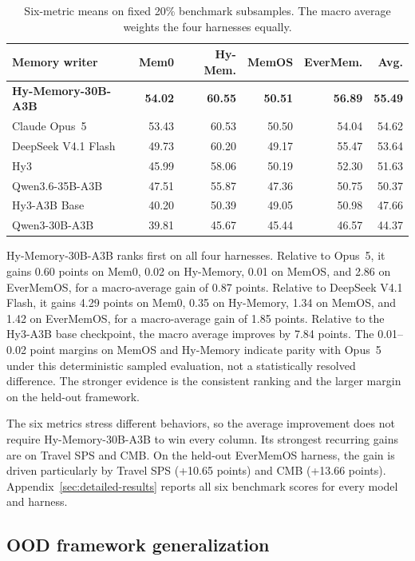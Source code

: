\documentclass{article}
\begin{document}
\begin{table}[t]
\centering
\small
\setlength{\tabcolsep}{3.5pt}
\begin{tabular}{@{}lrrrrr@{}}
\toprule
Memory writer & Mem0 & Hy-Mem. & MemOS & EverMem. & Avg. \\
\midrule
\textbf{Hy-Memory-30B-A3B} & \textbf{54.02} & \textbf{60.55} & \textbf{50.51} & \textbf{56.89} & \textbf{55.49} \\
Claude Opus~5 & 53.43 & 60.53 & 50.50 & 54.04 & 54.62 \\
DeepSeek V4.1 Flash & 49.73 & 60.20 & 49.17 & 55.47 & 53.64 \\
Hy3 & 45.99 & 58.06 & 50.19 & 52.30 & 51.63 \\
Qwen3.6-35B-A3B & 47.51 & 55.87 & 47.36 & 50.75 & 50.37 \\
Hy3-A3B Base & 40.20 & 50.39 & 49.05 & 50.98 & 47.66 \\
Qwen3-30B-A3B & 39.81 & 45.67 & 45.44 & 46.57 & 44.37 \\
\bottomrule
\end{tabular}
\caption{Six-metric means on fixed 20\% benchmark subsamples. The macro average weights the four harnesses equally.}
\label{tab:main-results}
\end{table}

Hy-Memory-30B-A3B ranks first on all four harnesses. Relative to Opus~5, it gains 0.60 points on Mem0, 0.02 on Hy-Memory, 0.01 on MemOS, and 2.86 on EverMemOS, for a macro-average gain of 0.87 points. Relative to DeepSeek V4.1 Flash, it gains 4.29 points on Mem0, 0.35 on Hy-Memory, 1.34 on MemOS, and 1.42 on EverMemOS, for a macro-average gain of 1.85 points. Relative to the Hy3-A3B base checkpoint, the macro average improves by 7.84 points. The 0.01--0.02 point margins on MemOS and Hy-Memory indicate parity with Opus~5 under this deterministic sampled evaluation, not a statistically resolved difference. The stronger evidence is the consistent ranking and the larger margin on the held-out framework.

The six metrics stress different behaviors, so the average improvement does not require Hy-Memory-30B-A3B to win every column. Its strongest recurring gains are on Travel SPS and CMB. On the held-out EverMemOS harness, the gain is driven particularly by Travel SPS (+10.65 points) and CMB (+13.66 points). Appendix~\ref{sec:detailed-results} reports all six benchmark scores for every model and harness.

\subsection{OOD framework generalization}
\end{document}
